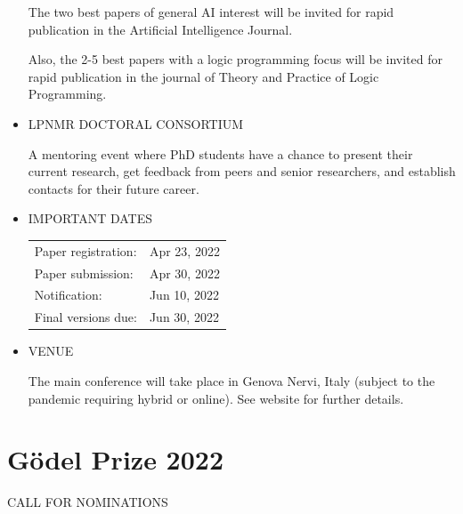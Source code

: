 \documentclass[prodmode,acmtecs]{acmsmall} %
\begin{document}
\begin{itemize}
  The two best papers of general AI interest will be invited for rapid publication in the Artificial Intelligence Journal. 
 
  Also, the 2-5 best papers with a logic programming focus will be invited for rapid publication in the journal of Theory and Practice of Logic Programming.  
 
\item  LPNMR DOCTORAL CONSORTIUM  
 
  A mentoring event where PhD students have a chance to present their current research, get feedback from peers and senior researchers, and establish contacts for their future career.  
 
\item  IMPORTANT DATES 
 
\begin{tabulary}{\linewidth}{LL}Paper registration:  & Apr 23, 2022 \\
Paper submission:  & Apr 30, 2022 \\
Notification:  & Jun 10, 2022 \\
Final versions due:  & Jun 30, 2022 \\
\end{tabulary}
 
\item  VENUE  
 
  The main conference will take place in Genova Nervi, Italy (subject to the pandemic requiring hybrid or online). See website for further details.  
 
\end{itemize}\section{Gödel Prize 2022}\label{GdelPrize2022}CALL FOR NOMINATIONS 
\end{document}
